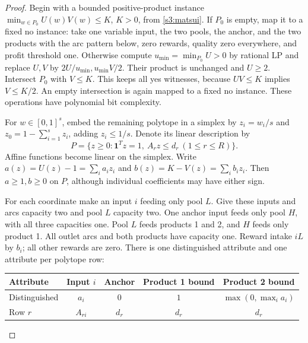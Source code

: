\begin{proof}
Begin with a bounded positive-product instance
$\min_{w\in P_0}U(w)V(w)\le K$, $K>0$, from \cref{s3:matsui}.
If $P_0$ is empty, map it to a fixed no instance: take one variable input, the two pools,
the anchor, and the two products with the arc pattern below, zero rewards,
quality zero everywhere, and profit threshold one. Otherwise compute
$u_{\min}=\min_{P_0}U>0$ by rational LP and replace $U,V$ by
$2U/u_{\min},u_{\min}V/2$. Their product is unchanged and $U\ge2$.
Intersect $P_0$ with $V\le K$. This keeps all yes witnesses, because
$UV\le K$ implies $V\le K/2$. An empty intersection is again mapped
to a fixed no instance. These operations have polynomial bit complexity.

For $w\in[0,1]^s$, embed the remaining polytope in a simplex by
$z_i=w_i/s$ and $z_0=1-\sum_{i=1}^s z_i$, adding $z_i\le1/s$.
Denote its linear description by
\[
 P=\{z\ge0:\mathbf1^Tz=1,\ A_rz\le d_r\ (1\le r\le R)\}.
\]
Affine functions become linear on the simplex. Write
$a(z)=U(z)-1=\sum_i a_iz_i$ and $b(z)=K-V(z)=\sum_i b_iz_i$.
Then $a\ge1,b\ge0$ on $P$, although individual coefficients may
have either sign.

For each coordinate make an input $i$ feeding only pool $L$. Give these
inputs and arcs capacity two and pool $L$ capacity two. One anchor
input feeds only pool $H$, with all three capacities one. Pool $L$
feeds products 1 and 2, and $H$ feeds only product 1. All outlet arcs
and both products have capacity one. Reward intake $iL$ by $b_i$;
all other rewards are zero. There is one distinguished attribute and
one attribute per polytope row:
\begin{center}
\begin{tabular}{lcccc}
\toprule
Attribute & Input $i$ & Anchor & Product 1 bound & Product 2 bound\\
\midrule
Distinguished & $a_i$ & $0$ & $1$ & $\max(0,\max_i a_i)$\\
Row $r$ & $A_{ri}$ & $d_r$ & $d_r$ & $d_r$\\
\bottomrule
\end{tabular}
\end{center}


\end{proof}
